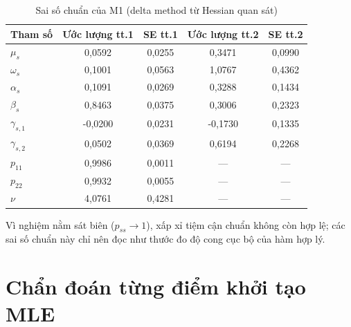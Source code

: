 \documentclass[11pt,a4paper]{article}
\begin{document}
\begin{table}[H]\centering\footnotesize
\caption{Sai số chuẩn của M1 (delta method từ Hessian quan sát)}
\begin{tabularx}{\textwidth}{l C C C C}
\toprule
\textbf{Tham số} & \textbf{Ước lượng tt.1} & \textbf{SE tt.1} & \textbf{Ước lượng tt.2} & \textbf{SE tt.2} \\
\midrule
$\mu_s$ & 0{,}0592 & 0{,}0255 & 0{,}3471 & 0{,}0990 \\
$\omega_s$ & 0{,}1001 & 0{,}0563 & 1{,}0767 & 0{,}4362 \\
$\alpha_s$ & 0{,}1091 & 0{,}0269 & 0{,}3288 & 0{,}1434 \\
$\beta_s$ & 0{,}8463 & 0{,}0375 & 0{,}3006 & 0{,}2323 \\
$\gamma_{s,1}$ & -0{,}0200 & 0{,}0231 & -0{,}1730 & 0{,}1335 \\
$\gamma_{s,2}$ & 0{,}0502 & 0{,}0369 & 0{,}6194 & 0{,}2268 \\
$p_{11}$ & 0{,}9986 & 0{,}0011 & --- & --- \\
$p_{22}$ & 0{,}9932 & 0{,}0055 & --- & --- \\
$\nu$ & 4{,}0761 & 0{,}4281 & --- & --- \\
\bottomrule
\end{tabularx}
\begin{tablenotes}\footnotesize
\item Vì nghiệm nằm sát biên ($p_{ss}\to1$), xấp xỉ tiệm cận chuẩn không còn hợp lệ; các sai số chuẩn này chỉ nên đọc như thước đo độ cong cục bộ của hàm hợp lý.
\end{tablenotes}
\end{table}

\section{Chẩn đoán từng điểm khởi tạo MLE}
\end{document}
